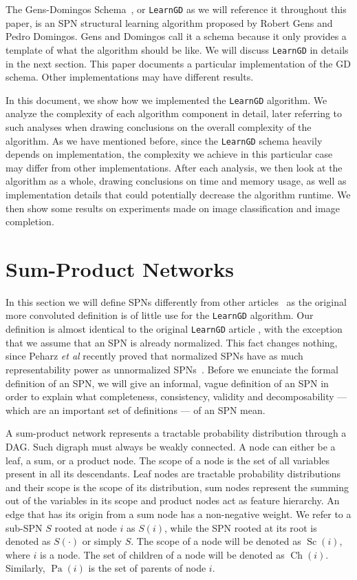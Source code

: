 \documentclass{amsart}
\DeclareMathOperator*{\Ch}{\text{Ch}}
\DeclareMathOperator*{\Pa}{\text{Pa}}
\DeclareMathOperator*{\Sc}{\text{Sc}}
\theoremstyle{plain}
\numberwithin{equation}{section}
\newcommand{\code}[1]{\lstinline[mathescape=true]{#1}}
\begin{document}
The Gens-Domingos Schema~\cite{gens-domingos}, or \code{LearnGD} as we will reference it throughout
this paper, is an SPN structural learning algorithm proposed by Robert Gens and Pedro Domingos.
Gens and Domingos call it a schema because it only provides a template of what the algorithm should
be like. We will discuss \code{LearnGD} in details in the next section. This paper documents a
particular implementation of the GD schema. Other implementations may have different results.

In this document, we show how we implemented the \code{LearnGD} algorithm. We analyze the
complexity of each algorithm component in detail, later referring to such analyses when drawing
conclusions on the overall complexity of the algorithm. As we have mentioned before, since the
\code{LearnGD} schema heavily depends on implementation, the complexity we achieve in this
particular case may differ from other implementations. After each analysis, we then look at the
algorithm as a whole, drawing conclusions on time and memory usage, as well as implementation
details that could potentially decrease the algorithm runtime. We then show some results on
experiments made on image classification and image completion.

\section{Sum-Product Networks}

In this section we will define SPNs differently from other articles~\cite{gens-domingos,
poon-domingos, clustering} as the original more convoluted definition is of little use for the
\code{LearnGD} algorithm. Our definition is almost identical to the original \code{LearnGD} article
\cite{gens-domingos}, with the exception that we assume that an SPN is already normalized. This
fact changes nothing, since Peharz \textit{et al} recently proved that normalized SPNs have as much
representability power as unnormalized SPNs~\cite{theoretical-spn}. Before we enunciate the formal
definition of an SPN, we will give an informal, vague definition of an SPN in order to explain what
completeness, consistency, validity and decomposability --- which are an important set of
definitions --- of an SPN mean.

A sum-product network represents a tractable probability distribution through a DAG\@. Such digraph
must always be weakly connected. A node can either be a leaf, a sum, or a product node. The scope
of a node is the set of all variables present in all its descendants. Leaf nodes are tractable
probability distributions and their scope is the scope of its distribution, sum nodes represent the
summing out of the variables in its scope and product nodes act as feature hierarchy. An edge that
has its origin from a sum node has a non-negative weight. We refer to a sub-SPN $S$ rooted at node
$i$ as $S(i)$, while the SPN rooted at its root is denoted as $S(\cdot)$ or simply $S$. The scope
of a node will be denoted as $\Sc(i)$, where $i$ is a node. The set of children of a node will be
denoted as $\Ch(i)$. Similarly, $\Pa(i)$ is the set of parents of node $i$.
\end{document}
